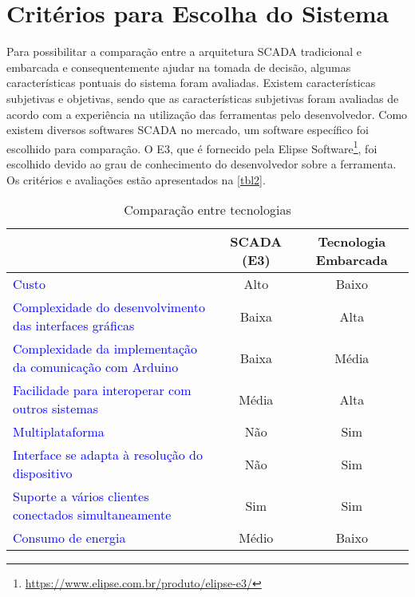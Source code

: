 	\section{Critérios para Escolha do Sistema}
		Para possibilitar a comparação entre a arquitetura SCADA tradicional e embarcada e consequentemente ajudar na tomada de decisão, algumas características pontuais do sistema foram avaliadas. Existem características subjetivas e objetivas, sendo que as características subjetivas foram avaliadas de acordo com a experiência na utilização das ferramentas pelo desenvolvedor. Como existem diversos softwares SCADA no mercado, um software específico foi escolhido para comparação. O E3, que é fornecido pela Elipse Software\footnote{\url{https://www.elipse.com.br/produto/elipse-e3/}}, foi escolhido devido ao grau de conhecimento do desenvolvedor sobre a ferramenta. Os critérios e avaliações estão apresentados na \autoref{tbl2}.
		
		\begin{table}[!htb]
			\centering
			\caption{Comparação entre tecnologias}
			\label{tbl2}
			\def\arraystretch{1.5}
			\begin{tabularx}{\textwidth}{p{7cm} | c c}
				\hline
				\diagbox{\textbf{Critério}}{\textbf{Arquitetura}} & \multicolumn{1}{c}{\textbf{SCADA (E3)}} & \multicolumn{1}{p{5cm}}{\textbf{Tecnologia Embarcada}} \\ \hline
				
				\textcolor{blue}{Custo} & \multicolumn{1}{c}{Alto} & \multicolumn{1}{c}{Baixo} \\
				
				\textcolor{blue}{Complexidade do desenvolvimento das interfaces gráficas} & \multicolumn{1}{c}{Baixa} & \multicolumn{1}{c}{Alta} \\
				
				\textcolor{blue}{Complexidade da implementação da comunicação com Arduino} & \multicolumn{1}{c}{Baixa} & \multicolumn{1}{c}{Média} \\
				
				\textcolor{blue}{Facilidade para interoperar com outros sistemas} & \multicolumn{1}{c}{Média} & \multicolumn{1}{c}{Alta} \\ 
				
				\textcolor{blue}{Multiplataforma} & \multicolumn{1}{c}{Não} & \multicolumn{1}{c}{Sim} \\
				
				\textcolor{blue}{Interface se adapta à resolução do dispositivo} & \multicolumn{1}{c}{Não} & \multicolumn{1}{c}{Sim} \\
				
				\textcolor{blue}{Suporte a vários clientes conectados simultaneamente} & \multicolumn{1}{c}{Sim} & \multicolumn{1}{c}{Sim} \\
				
				\textcolor{blue}{Consumo de energia} & \multicolumn{1}{c}{Médio} & \multicolumn{1}{c}{Baixo} \\
						
				\hline
			\end{tabularx}
		\end{table}
	

